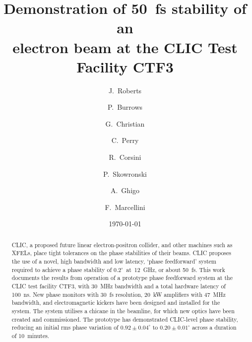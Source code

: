 \documentclass[%
 reprint,
 amsmath,amssymb,
 prl,
]{revtex4-1}
\begin{document}

\title{Demonstration of 50~fs stability of an \\ electron beam at the CLIC Test 
Facility CTF3}

\author{J.~Roberts}
\author{P.~Burrows}
\author{G.~Christian}
\author{C.~Perry}

\author{R.~Corsini}
\author{P.~Skowronski}

\author{A.~Ghigo}
\author{F.~Marcellini}

\date{\today}

\begin{abstract}
CLIC, a proposed future linear electron-positron collider, and other machines 
such as XFELs, place tight tolerances on the phase stabilities of their beams. 
CLIC proposes the use of a novel, high bandwidth and low latency, `phase 
feedforward' system required to achieve a phase stability of 
\(0.2^\circ\)~at~12~GHz, or 
about 50~fs. This work documents the results from operation of a prototype 
phase 
feedforward system at the CLIC test facility CTF3, with 30~MHz bandwidth and a 
total hardware latency of 100~ns. New phase monitors with 
30~fs resolution, 20~kW amplifiers with 47~MHz bandwidth, and electromagnetic 
kickers have been designed and installed for the system. The system utilises a 
chicane in the beamline, for which new optics have been created and 
commissioned. The prototype has demonstrated CLIC-level phase stability, 
reducing an initial rms phase variation of \(0.92\pm0.04^\circ\) to 
\(0.20\pm0.01^\circ\) across a duration of 10~minutes.
\end{abstract}

\maketitle

\end{document}
